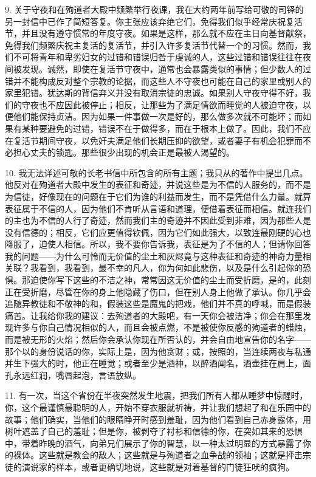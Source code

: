 9. 关于守夜和在殉道者大殿中频繁举行夜课，我在大约两年前写给可敬的司铎的另一封信中已作了简短答复。你主张应该弃绝它们，免得我们似乎经常庆祝复活节，并且没有遵守惯常的年度守夜。如果是这样，那么就不应在主日向基督献祭，免得我们频繁庆祝主复活的复活节，并引入许多复活节代替一个的习惯。然而，我们不可将青年和卑劣妇女的过错和错误归咎于虔诚的人，这些过错和错误往往在夜间被发现。诚然，即使在复活节守夜中，通常也会暴露类似的事情；但少数人的过错并不能构成反对整个宗教的论据，而这些人不守夜也可能在自己的家里或别人的家里犯错。犹达斯的背信弃义并没有取消宗徒的忠诚。如果别人守夜守得不好，我们的守夜也不应因此被停止；相反，让那些为了满足情欲而睡觉的人被迫守夜，以便他们能保持贞洁。因为如果一件事做一次是好的，那么做多次就不可能坏；而如果有某种要避免的过错，错误不在于做得多，而在于根本上做了。因此，我们不应在复活节期间守夜，以免奸夫满足他们长期压抑的欲望，或者妻子有机会犯罪而不必担心丈夫的锁匙。那些很少出现的机会正是最被人渴望的。\par

10. 我无法详述可敬的长老书信中所包含的所有主题；我只从的著作中提出几点。他反对在殉道者大殿中发生的表征和奇迹，并说这些是为不信的人服务的，而不是为信徒，好像现在的问题在于它们为谁的利益而发生，而不是凭借什么力量。就算表征属于不信的人，因为他们不肯听从言语和道理，便借着表征而相信。就连我们的主也为不信的人行了奇迹，然而我们主的奇迹并不因此受到非难，因为那些人是没有信德的；相反，它们应更值得钦佩，因为它们如此强大，以致连最刚硬的心也降服了，迫使人相信。所以，我不要你告诉我，表征是为了不信的人；但请你回答我的问题——为什么可怜而无价值的尘土和灰烬竟与这种表征和奇迹的神奇力量相关联？我看到，我看到，最不幸的凡人，你为何如此悲伤，以及是什么引起你的恐惧。那迫使你写下这些的不洁之神，常常因这无价值的尘土而受折磨，是的，此刻正在受折磨，尽管在你的身上他隐藏了伤口，但在别人身上他做了承认。你几乎会追随异教徒和不敬神的和，假装这些是魔鬼的把戏，他们并不真的呼喊，而是假装痛苦。让我给你我的建议：去殉道者的大殿吧，有一天你会被洁净；你会在那里发现许多与你自己情况相似的人，而且会被点燃，不是被使你反感的殉道者的蜡烛，而是被无形的火焰；然后你会承认你现在所否认的，并会自由地宣告你的名字——那个以的身份说话的你，实际上是，因为他贪财；或，按照的，当连续两夜与私通并生下强大的时，他正在睡觉；或者至少是酒神，以醉酒闻名，酒壶挂在肩上，面孔永远红润，嘴唇起泡，言语放纵。\par

11. 有一次，当这个省份在半夜突然发生地震，把我们所有人都从睡梦中惊醒时，你，这个最谨慎最聪明的人，开始不穿衣服就祈祷，并让我们想起了和在乐园中的故事；他们确实，当他们的眼睛睁开时感到羞耻，因为他们看到自己赤身露体，用树叶遮盖了自己的羞耻；但是你，被剥夺了衬衫和信德的你，在突如其来的恐惧中，带着昨晚的酒气，向弟兄们展示了你的智慧，以一种太过明显的方式暴露了你的裸体。这些就是教会的敌人；这些就是与殉道者之血争战的领袖；这就是抨击宗徒的演说家的样本，或者更确切地说，这些就是对着基督的门徒狂吠的疯狗。\par


